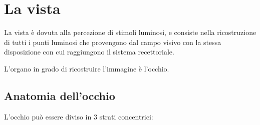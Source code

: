 \documentclass[]{article}
\begin{document}
\section{La vista}\label{la-vista}

La vista è dovuta alla percezione di stimoli luminosi, e consiste nella
ricostruzione di tutti i punti luminosi che provengono dal campo visivo
con la stessa disposizione con cui raggiungono il sistema recettoriale.

L'organo in grado di ricostruire l'immagine è l'occhio.

\subsection{Anatomia dell'occhio}\label{anatomia-dellocchio}

L'occhio può essere diviso in 3 strati concentrici:
\end{document}

